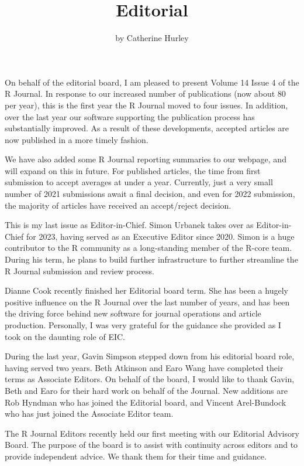 \title{Editorial}
\author{by Catherine Hurley}

\maketitle


On behalf of the editorial board, I am pleased to present Volume 14 Issue 4 of the R Journal. In response to our increased number of publications (now about 80 per year), this is the first year the R Journal moved to four issues. In addition, over the last year our software supporting the publication process has substantially improved. As a result of these developments, accepted articles are now published in a more timely fashion.

We have also added some R Journal reporting summaries to our webpage, and will expand on this in future.
For published articles, the time from first submission to accept averages at under a year.
Currently, just a very small number of 2021 submissions await a final decision, and even for 2022 submission, the majority of articles have received an accept/reject decision.

This is my last issue as Editor-in-Chief. Simon Urbanek takes over as Editor-in-Chief for 2023, having served as an Executive Editor since 2020. Simon is a huge contributor to the R community as a long-standing member of the R-core team. During his term, he plans to build further infrastructure to further streamline the R Journal submission and review process.

Dianne Cook recently finished her Editorial board term. She has been a hugely positive influence on the R Journal over the last number of years, and has been the driving force behind new software for journal operations and article production. Personally, I was very grateful for the guidance she provided as I took on the daunting role of EIC.

During the last year, Gavin Simpson stepped down from his editorial board role, having served two years. Beth Atkinson and Earo Wang have completed their terms as Associate Editors. On behalf of the board, I would like to thank Gavin, Beth and Earo for their hard work on behalf of the Journal.
New additions are Rob Hyndman who has joined the Editorial board, and Vincent Arel-Bundock who has just joined the Associate Editor team.

The R Journal Editors recently held our first meeting with our Editorial Advisory Board. The purpose of the board is to assist with continuity across editors and to provide independent advice. We thank them for their time and guidance.

